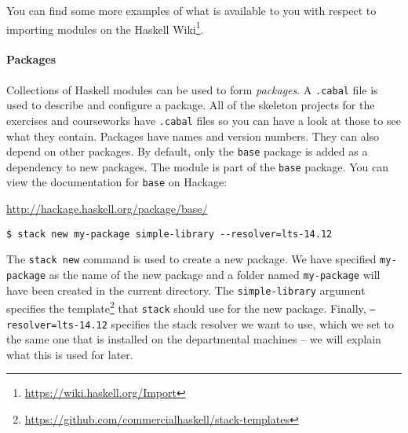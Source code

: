 You can find some more examples of what is available to you with respect to importing modules on the Haskell Wiki\footnote{\url{https://wiki.haskell.org/Import}}.


\paragraph{Packages} Collections of Haskell modules can be used to form \emph{packages}. A \texttt{\small .cabal} file is used to describe and configure a package. All of the skeleton projects for the exercises and courseworks have \texttt{\small .cabal} files so you can have a look at those to see what they contain. Packages have names and version numbers. They can also depend on other packages. By default, only the \texttt{\small base} package is added as a dependency to new packages. The  module is part of the \texttt{\small base} package. You can view the documentation for \texttt{\small base} on Hackage:
\begin{center}\small 
	\url{http://hackage.haskell.org/package/base/}
\end{center}

\begin{verbatim}
$ stack new my-package simple-library --resolver=lts-14.12
\end{verbatim}
The \texttt{\small stack new} command is used to create a new package. We have specified \texttt{\small my-package} as the name of the new package and a folder named \texttt{\small my-package} will have been created in the current directory. The \texttt{\small simple-library} argument specifies the template\footnote{\url{https://github.com/commercialhaskell/stack-templates}} that \texttt{\small stack} should use for the new package. Finally, \texttt{\small --resolver=lts-14.12} specifies the stack resolver we want to use, which we set to the same one that is installed on the departmental machines -- we will explain what this is used for later.

